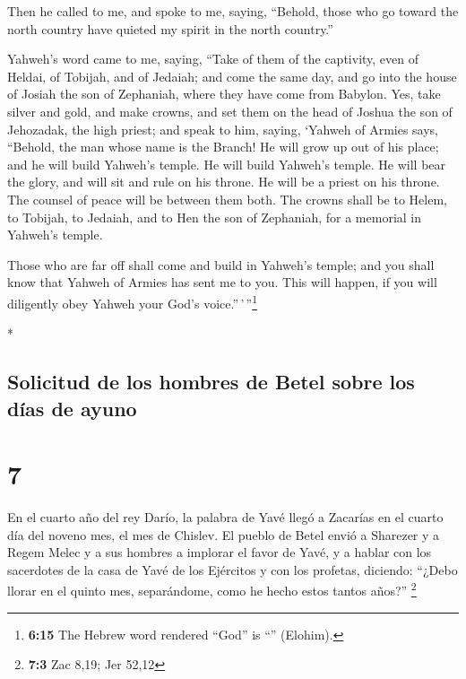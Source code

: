 \begin{paracol}{2}
\begin{otherlanguage}{english}
 Then he called to me, and spoke to me, saying, ``Behold,
those who go toward the north country have quieted my spirit in the
north country.''

 Yahweh's word came to me, saying,  ``Take
of them of the captivity, even of Heldai, of Tobijah, and of Jedaiah;
and come the same day, and go into the house of Josiah the son of
Zephaniah, where they have come from Babylon.  Yes, take
silver and gold, and make crowns, and set them on the head of Joshua the
son of Jehozadak, the high priest;  and speak to him,
saying, `Yahweh of Armies says, ``Behold, the man whose name is the
Branch! He will grow up out of his place; and he will build Yahweh's
temple.  He will build Yahweh's temple. He will bear the
glory, and will sit and rule on his throne. He will be a priest on his
throne. The counsel of peace will be between them both. 
The crowns shall be to Helem, to Tobijah, to Jedaiah, and to Hen the son
of Zephaniah, for a memorial in Yahweh's temple.

 Those who are far off shall come and build in Yahweh's
temple; and you shall know that Yahweh of Armies has sent me to you.
This will happen, if you will diligently obey Yahweh your God's
voice.''\,'\,''\footnote{\textbf{6:15} The Hebrew word rendered ``God''
  is ``'' (Elohim).}

\end{otherlanguage}

\switchcolumn[0]*

\hypertarget{solicitud-de-los-hombres-de-betel-sobre-los-duxedas-de-ayuno}{%
\subsection{Solicitud de los hombres de Betel sobre los días de
ayuno}\label{solicitud-de-los-hombres-de-betel-sobre-los-duxedas-de-ayuno}}

\hypertarget{section-12}{%
\section{7}\label{section-12}}

 En el cuarto año del rey Darío, la palabra de Yavé llegó
a Zacarías en el cuarto día del noveno mes, el mes de Chislev.
 El pueblo de Betel envió a Sharezer y a Regem Melec y a
sus hombres a implorar el favor de Yavé,  y a hablar con
los sacerdotes de la casa de Yavé de los Ejércitos y con los profetas,
diciendo: ``¿Debo llorar en el quinto mes, separándome, como he hecho
estos tantos años?'' \footnote{\textbf{7:3} Zac 8,19; Jer 52,12}


\end{paracol}
